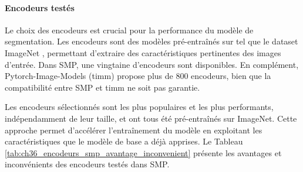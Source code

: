 \paragraph{Encodeurs testés}
Le choix des encodeurs est crucial pour la performance du modèle de segmentation. Les encodeurs sont des modèles pré-entraînés sur tel que le dataset ImageNet \cite{noauthor_imagenet_nodate}, permettant d'extraire des caractéristiques pertinentes des images d'entrée. Dans SMP, une vingtaine d'encodeurs sont disponibles. En complément, Pytorch-Image-Models (timm) \cite{wightman_pytorch_2025} propose plus de 800 encodeurs, bien que la compatibilité entre SMP et timm ne soit pas garantie.

Les encodeurs sélectionnés sont les plus populaires et les plus performants, indépendamment de leur taille, et ont tous été pré-entraînés sur ImageNet. Cette approche permet d'accélérer l'entraînement du modèle en exploitant les caractéristiques que le modèle de base a déjà apprises. Le Tableau \ref{tab:ch36_encodeurs_smp_avantage_inconvenient} présente les avantages et inconvénients des encodeurs testés dans SMP.

